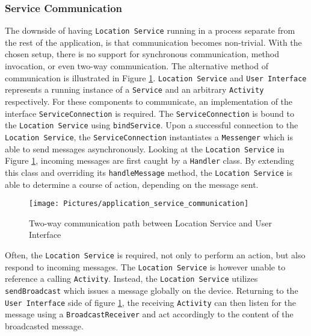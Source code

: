 \subsubsection{Service Communication}\label{subsubsec:service_communication}
The downside of having \texttt{Location Service} running in a process separate from the rest of the application, is that communication becomes non-trivial. With the chosen setup, there is no support for synchronous communication, method invocation, or even two-way communication. The alternative method of communication is illustrated in Figure \ref{fig:application_service_communication}. \texttt{Location Service} and \texttt{User Interface} represents a running instance of a \texttt{Service} and an arbitrary \texttt{Activity} respectively. For these components to communicate, an implementation of the interface \texttt{ServiceConnection} is required\citep{android_serviceconnection}.  The \texttt{ServiceConnection} is bound to the \texttt{Location Service} using \texttt{bindService}\citep{android_bindservice}. Upon a successful connection to the \texttt{Location Service}, the \texttt{ServiceConnection} instantiates a \texttt{Messenger}\citep{android_messenger} which is able to send messages asynchronously. Looking at the \texttt{Location Service} in Figure \ref{fig:application_service_communication}, incoming messages are first caught by a \texttt{Handler}\citep{android_handler} class. By extending this class and overriding its \texttt{handleMessage} method, the \texttt{Location Service} is able to determine a course of action, depending on the message sent.

\begin{figure}[tb]
\centering
\texttt{[image: Pictures/application\_service\_communication]}
\caption{Two-way communication path between Location Service and User Interface}
\label{fig:application_service_communication}
\end{figure}

Often, the \texttt{Location Service} is required, not only to perform an action, but also respond to incoming messages. The \texttt{Location Service} is however unable to reference a calling \texttt{Activity}. Instead, the \texttt{Location Service} utilizes \texttt{sendBroadcast}\citep{android_sendbroadcast} which issues a message globally on the device. Returning to the \texttt{User Interface} side of figure \ref{fig:application_service_communication}, the receiving \texttt{Activity} can then listen for the message using a \texttt{BroadcastReceiver}\citep{android_broadcastreceiver} and act accordingly to the content of the broadcasted message. 

